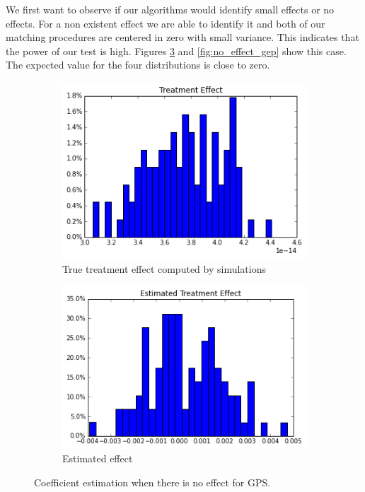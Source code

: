 \documentclass[11pt]{article}
\begin{document}
We first want to observe if our algorithms would identify small effects or no effects. For a non existent effect we are able to identify it and both of our matching procedures are centered in zero with small variance. This indicates that the power of our test is high. Figures \ref{fig:no_effect_gps} and \ref{fig:no_effect_gep} show this case. The expected value for the four distributions is close to zero.


\begin{figure}[h]
\centering
\begin{subfigure}{.5\textwidth}
  \centering
  \includegraphics[width=.9\linewidth]{treatment_effect_no_influence_real.png}
  \caption{True treatment effect computed by simulations}
  \label{fig:sub1}
\end{subfigure}%
\begin{subfigure}{.5\textwidth}
  \centering
  \includegraphics[width=.9\linewidth]{estimated_no_influence.png}
  \caption{Estimated effect}
  \label{fig:sub2}
\end{subfigure}
\caption{Coefficient estimation when there is no effect for GPS.}
\label{fig:no_effect_gps}
\end{figure}
\end{document}
